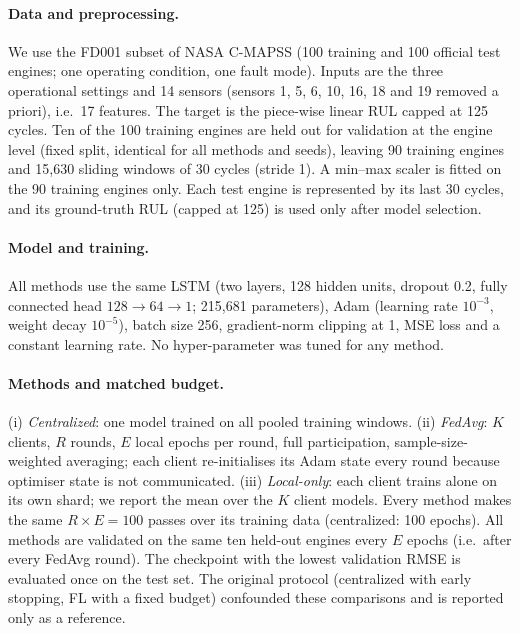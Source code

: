 \paragraph{Data and preprocessing.}
We use the FD001 subset of NASA C-MAPSS (100 training and 100 official test
engines; one operating condition, one fault mode). Inputs are the three
operational settings and 14 sensors (sensors 1, 5, 6, 10, 16, 18 and 19 removed
a priori), i.e.\ 17 features. The target is the piece-wise linear RUL capped at
125 cycles. Ten of the 100 training engines are held out for validation at the
engine level (fixed split, identical for all methods and seeds), leaving 90
training engines and 15{,}630 sliding windows of 30 cycles (stride 1). A
min--max scaler is fitted on the 90 training engines only. Each test engine is
represented by its last 30 cycles, and its ground-truth RUL (capped at 125) is
used only after model selection.

\paragraph{Model and training.}
All methods use the same LSTM (two layers, 128 hidden units, dropout 0.2,
fully connected head $128\to64\to1$; 215{,}681 parameters), Adam (learning rate
$10^{-3}$, weight decay $10^{-5}$), batch size 256, gradient-norm clipping at 1,
MSE loss and a constant learning rate. No hyper-parameter was tuned for any method.

\paragraph{Methods and matched budget.}
(i) \emph{Centralized}: one model trained on all pooled training windows.
(ii) \emph{FedAvg}: $K$ clients, $R$ rounds, $E$ local epochs per round, full
participation, sample-size-weighted averaging; each client re-initialises its
Adam state every round because optimiser state is not communicated.
(iii) \emph{Local-only}: each client trains alone on its own shard; we report the
mean over the $K$ client models. Every method makes the same $R\times E=100$
passes over its training data (centralized: 100 epochs). All methods are
validated on the same ten held-out engines every $E$ epochs (i.e.\ after every
FedAvg round). The checkpoint with the lowest validation RMSE is evaluated once
on the test set. The original protocol (centralized with early stopping, FL with
a fixed budget) confounded these comparisons and is reported only as a reference.

